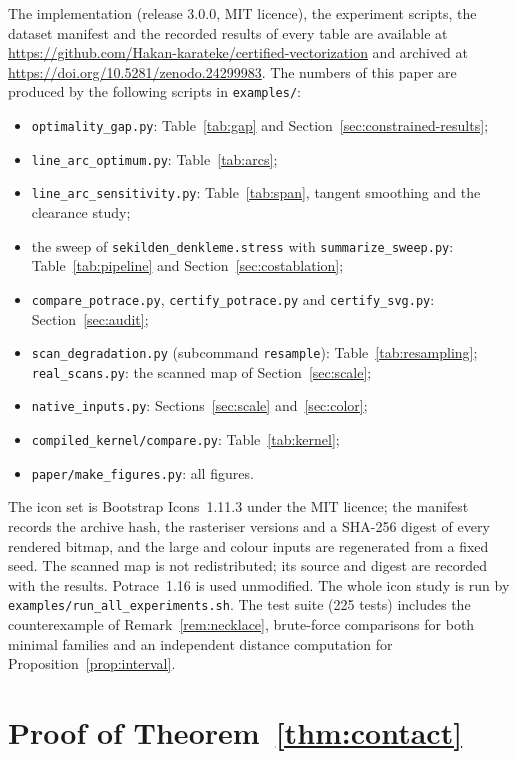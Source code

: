 \documentclass[11pt,a4paper]{article}
\theoremstyle{definition}
\theoremstyle{remark}
\begin{document}
The implementation (release 3.0.0, MIT licence), the experiment scripts, the
dataset manifest and the recorded results of every table are available at
\url{https://github.com/Hakan-karateke/certified-vectorization} and archived at
\url{https://doi.org/10.5281/zenodo.24299983}. The numbers of
this paper are produced by the following scripts in \texttt{examples/}:
\begin{itemize}
\item \texttt{optimality\_gap.py}: Table~\ref{tab:gap} and
  Section~\ref{sec:constrained-results};
\item \texttt{line\_arc\_optimum.py}: Table~\ref{tab:arcs};
\item \texttt{line\_arc\_sensitivity.py}: Table~\ref{tab:span}, tangent
  smoothing and the clearance study;
\item the sweep of \texttt{sekilden\_denkleme.stress} with
  \texttt{summarize\_sweep.py}: Table~\ref{tab:pipeline} and
  Section~\ref{sec:costablation};
\item \texttt{compare\_potrace.py}, \texttt{certify\_potrace.py} and
  \texttt{certify\_svg.py}: Section~\ref{sec:audit};
\item \texttt{scan\_degradation.py} (subcommand \texttt{resample}):
  Table~\ref{tab:resampling}; \texttt{real\_scans.py}: the scanned map of
  Section~\ref{sec:scale};
\item \texttt{native\_inputs.py}: Sections~\ref{sec:scale}
  and~\ref{sec:color};
\item \texttt{compiled\_kernel/compare.py}: Table~\ref{tab:kernel};
\item \texttt{paper/make\_figures.py}: all figures.
\end{itemize}
The icon set is Bootstrap Icons~1.11.3 under the MIT licence; the manifest
records the archive hash, the rasteriser versions and a SHA-256 digest of
every rendered bitmap, and the large and colour inputs are regenerated from a
fixed seed. The scanned map is not redistributed; its source and digest are
recorded with the results. Potrace~1.16 is used unmodified. The whole icon
study is run by \texttt{examples/run\_all\_experiments.sh}. The test suite
(225 tests)
includes the counterexample of Remark~\ref{rem:necklace}, brute-force
comparisons for both minimal families and an independent distance
computation for Proposition~\ref{prop:interval}.


\appendix
\section{Proof of Theorem~\ref{thm:contact}}\label{app:contact}
\end{document}

